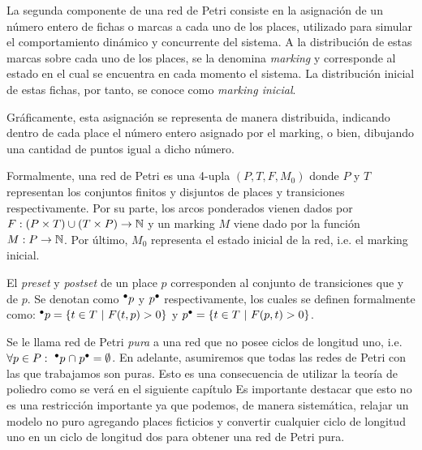 La segunda componente de una red de Petri consiste en la asignación
de un número entero de fichas o marcas a cada uno de los places, 
utilizado para simular el comportamiento dinámico y concurrente del sistema.
A la distribución de estas marcas sobre cada uno de los places, se la denomina
\textit{marking} y corresponde al estado en el cual se encuentra en cada momento el sistema.
La distribución inicial de estas fichas, por tanto, se conoce como \textit{marking inicial}.

Gráficamente, esta asignación se representa de manera distribuida, indicando dentro 
de cada place el número entero asignado por el marking, o bien, dibujando una 
cantidad de puntos igual a dicho número.

Formalmente, una red de Petri es una 4-upla $(P,T,F,M_0)$ donde $P$ y $T$\footnotemark[1]
representan los conjuntos finitos y disjuntos de places y transiciones respectivamente.
Por su parte, los arcos ponderados vienen dados por \mbox{$F:(P \times T) \cup (T \times P)  \to \mathbb{N}$}
y un marking $M$ viene dado por la función \mbox{$M:P \to \mathbb{N}$}.
Por último, $M_0$ representa el estado inicial de la red, i.e. el marking inicial.


El \textit{preset} y \textit{postset} de un place $p$ corresponden al conjunto 
de transiciones que  y  de $p$. Se denotan como $\mbox{$^\bullet p$}$ y $\mbox{$p^\bullet$}$
respectivamente, los cuales se definen formalmente como: $\mbox{$^\bullet p$} =  \{t \in T ~|~ F(t,p) > 0 \}$
y $\mbox{$p^\bullet$} = \{t \in T ~|~ F(p,t) > 0 \}$.

Se le llama red de Petri \emph{pura} a una red que no posee ciclos de longitud uno, i.e.
$\forall p \in P:~ {\mbox{$^\bullet p$}} \mathrel{\cap} {\mbox{$p^\bullet$}} = \emptyset$.
En adelante, asumiremos que todas las redes de Petri con las que trabajamos son puras.
Esto es una consecuencia de utilizar la teoría de poliedro como se verá en el siguiente capítulo
Es importante destacar que esto no es una 
restricción importante ya que podemos, de manera sistemática, relajar un modelo no puro agregando
places ficticios y convertir cualquier ciclo de longitud uno en un ciclo de longitud dos para
obtener una red de Petri pura.

